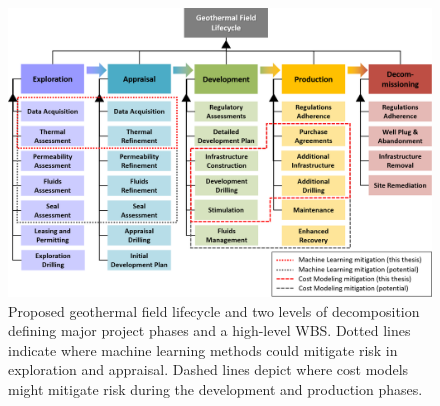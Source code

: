 \begin{figure}
\centering
\includegraphics[width=\textwidth]{templates/images/Figure-SystemDecomposition.png}
\caption[Geothermal field lifecycle]{Proposed geothermal field lifecycle and two levels of decomposition defining major project phases and a high-level WBS. Dotted lines indicate where machine learning methods could mitigate risk in exploration and appraisal. Dashed lines depict where cost models might mitigate risk during the development and production phases.}
\label{fig:geothermal_field_lifecycle}
\end{figure}

